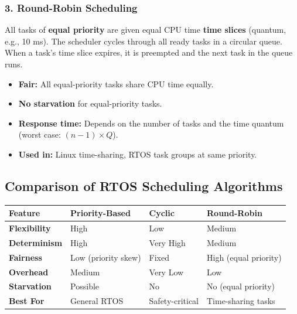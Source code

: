 \documentclass[12pt,a4paper]{article}
\renewcommand{\arraystretch}{1.45}
\begin{document}
\subsubsection*{3. Round-Robin Scheduling}

\begin{tcolorbox}[defbox, title={\textbf{Round-Robin Scheduling}}]
All tasks of \textbf{equal priority} are given equal CPU time \textbf{time slices} (quantum, e.g., 10 ms). The scheduler cycles through all ready tasks in a circular queue. When a task's time slice expires, it is preempted and the next task in the queue runs.
\end{tcolorbox}

\begin{itemize}[leftmargin=*, itemsep=3pt]
  \item \textbf{Fair:} All equal-priority tasks share CPU time equally.
  \item \textbf{No starvation} for equal-priority tasks.
  \item \textbf{Response time:} Depends on the number of tasks and the time quantum (worst case: $(n-1) \times Q$).
  \item \textbf{Used in:} Linux time-sharing, RTOS task groups at same priority.
\end{itemize}

\subsection{Comparison of RTOS Scheduling Algorithms}

\par\noindent
{\renewcommand{\arraystretch}{1.55}%
\begin{tabularx}{\linewidth}{|B{3.0cm}|Y|Y|Y|}
\hline
\textbf{Feature} & \textbf{Priority-Based} & \textbf{Cyclic} & \textbf{Round-Robin} \\
\hline
\textbf{Flexibility} & High & Low & Medium \\
\hline
\textbf{Determinism} & High & Very High & Medium \\
\hline
\textbf{Fairness} & Low (priority skew) & Fixed & High (equal priority) \\
\hline
\textbf{Overhead} & Medium & Very Low & Low \\
\hline
\textbf{Starvation} & Possible & No & No (equal priority) \\
\hline
\textbf{Best For} & General RTOS & Safety-critical & Time-sharing tasks \\
\hline
\end{tabularx}}
\end{document}
